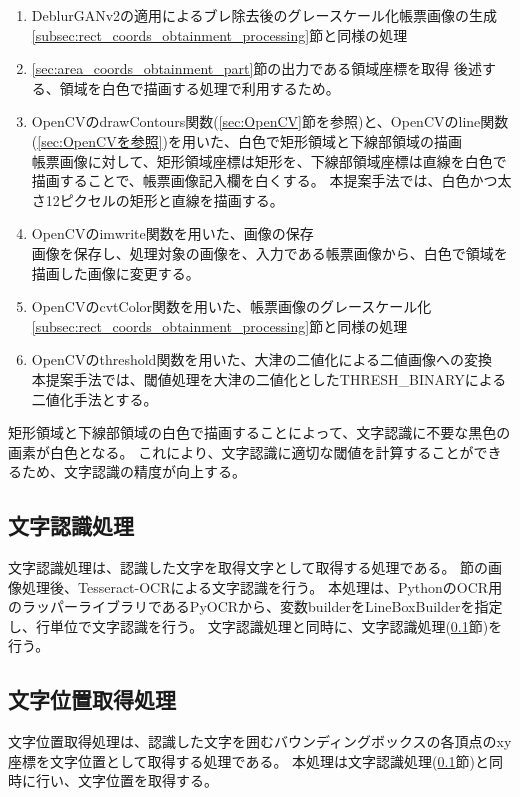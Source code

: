 \begin{enumerate}
    \item DeblurGANv2の適用によるブレ除去後のグレースケール化帳票画像の生成\\
        \ref{subsec:rect_coords_obtainment_processing}節と同様の処理
    \item \ref{sec:area_coords_obtainment_part}節の出力である領域座標を取得
        後述する、領域を白色で描画する処理で利用するため。
    \item OpenCVのdrawContours関数(\ref{sec:OpenCV}節を参照)と、OpenCVのline関数(\ref{sec:OpenCVを参照})を用いた、白色で矩形領域と下線部領域の描画\\
        帳票画像に対して、矩形領域座標は矩形を、下線部領域座標は直線を白色で描画することで、帳票画像記入欄を白くする。
        本提案手法では、白色かつ太さ12ピクセルの矩形と直線を描画する。
    \item OpenCVのimwrite関数を用いた、画像の保存\\
        画像を保存し、処理対象の画像を、入力である帳票画像から、白色で領域を描画した画像に変更する。
    \item OpenCVのcvtColor関数を用いた、帳票画像のグレースケール化\\
        \ref{subsec:rect_coords_obtainment_processing}節と同様の処理
    \item OpenCVのthreshold関数を用いた、大津の二値化による二値画像への変換\\
        本提案手法では、閾値処理を大津の二値化としたTHRESH\_BINARYによる二値化手法とする。
\end{enumerate}

矩形領域と下線部領域の白色で描画することによって、文字認識に不要な黒色の画素が白色となる。
これにより、文字認識に適切な閾値を計算することができるため、文字認識の精度が向上する。

\subsection{文字認識処理}\label{subsec:char_recognition_processing}
文字認識処理は、認識した文字を取得文字として取得する処理である。
\label{subsec:image_processing_for_char_recognition}節の画像処理後、Tesseract-OCRによる文字認識を行う。
本処理は、PythonのOCR用のラッパーライブラリであるPyOCRから、変数builderをLineBoxBuilderを指定し、行単位で文字認識を行う。
文字認識処理と同時に、文字認識処理(\ref{subsec:char_recognition_processing}節)を行う。


\subsection{文字位置取得処理}\label{subsec:char_position_obtainment_processing}
文字位置取得処理は、認識した文字を囲むバウンディングボックスの各頂点のxy座標を文字位置として取得する処理である。
本処理は文字認識処理(\ref{subsec:char_recognition_processing}節)と同時に行い、文字位置を取得する。

